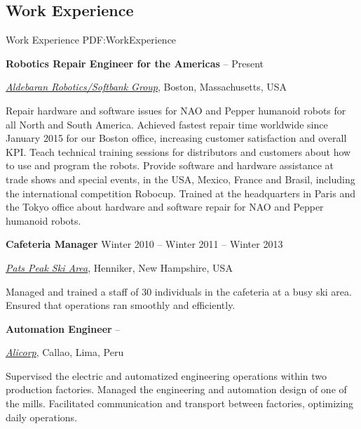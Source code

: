 \documentclass[letterpaper,MMMyyyy,nonstop]{simpleresumecv}
\begin{document}
\begin{body}
%


\section
{Work Experience}
{Work Experience}
{PDF:WorkExperience}

\textbf{Robotics Repair Engineer for the Americas}
\hfill
{} --
Present 
\begin{detail}
\normalsize{ \href{https://www.aldebaran.com/en}
{\textit{Aldebaran Robotics/Softbank Group}},
Boston, Massachusetts, USA }
\end{detail}

\GapNoBreak
\BulletItem
Repair hardware and software issues for NAO and Pepper humanoid robots for all North and South America. 
\BulletItem
Achieved fastest repair time worldwide since January 2015 for our Boston office, increasing customer satisfaction and overall KPI.
\BulletItem
Teach technical training sessions for distributors and customers about how to use and program the robots.
\BulletItem
Provide software and hardware assistance at trade shows and special events, in the USA, Mexico, France and Brasil, including the international competition Robocup.
\BulletItem
Trained at the headquarters in Paris and the Tokyo office about hardware and software repair for NAO and Pepper humanoid robots.

\BigGap
\textbf{Cafeteria Manager}
\hfill
Winter 2010 --
Winter 2011 --
Winter 2013
\begin{detail}
\normalsize{ \href{http://www.patspeak.com/}
{\textit{Pats Peak Ski Area}},
Henniker, New Hampshire, USA }
\end{detail}

\GapNoBreak
\BulletItem
Managed and trained a staff of 30 individuals in the cafeteria at a busy ski area.
\BulletItem
Ensured that operations ran smoothly and efficiently.

\BigGap
\textbf{Automation Engineer}
\hfill
{} --
\begin{detail}
\normalsize{ \href{http://www.alicorp.com.pe/alicorp/index.html}
{\textit{Alicorp}},
Callao, Lima, Peru }
\end{detail}

\GapNoBreak
\BulletItem
Supervised the electric and automatized engineering operations within two production factories.
\BulletItem
Managed the engineering and automation design of one of the mills. Facilitated communication and transport between factories, optimizing daily operations.


\end{body}
\end{document}
